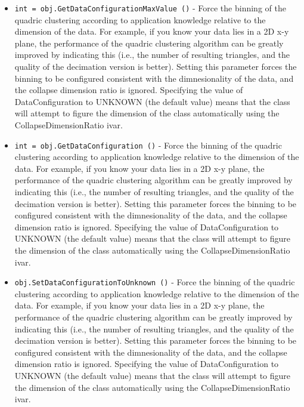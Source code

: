 \begin{itemize}
\item  \verb|int = obj.GetDataConfigurationMaxValue ()| -  Force the binning of the quadric clustering according to application
 knowledge relative to the dimension of the data. For example, if you
 know your data lies in a 2D x-y plane, the performance of the quadric
 clustering algorithm can be greatly improved by indicating this (i.e.,
 the number of resulting triangles, and the quality of the decimation
 version is better). Setting this parameter forces the binning to be
 configured consistent with the dimnesionality of the data, and the
 collapse dimension ratio is ignored. Specifying the value of
 DataConfiguration to UNKNOWN (the default value) means that the class
 will attempt to figure the dimension of the class automatically using
 the CollapseDimensionRatio ivar.

\item  \verb|int = obj.GetDataConfiguration ()| -  Force the binning of the quadric clustering according to application
 knowledge relative to the dimension of the data. For example, if you
 know your data lies in a 2D x-y plane, the performance of the quadric
 clustering algorithm can be greatly improved by indicating this (i.e.,
 the number of resulting triangles, and the quality of the decimation
 version is better). Setting this parameter forces the binning to be
 configured consistent with the dimnesionality of the data, and the
 collapse dimension ratio is ignored. Specifying the value of
 DataConfiguration to UNKNOWN (the default value) means that the class
 will attempt to figure the dimension of the class automatically using
 the CollapseDimensionRatio ivar.

\item  \verb|obj.SetDataConfigurationToUnknown ()| -  Force the binning of the quadric clustering according to application
 knowledge relative to the dimension of the data. For example, if you
 know your data lies in a 2D x-y plane, the performance of the quadric
 clustering algorithm can be greatly improved by indicating this (i.e.,
 the number of resulting triangles, and the quality of the decimation
 version is better). Setting this parameter forces the binning to be
 configured consistent with the dimnesionality of the data, and the
 collapse dimension ratio is ignored. Specifying the value of
 DataConfiguration to UNKNOWN (the default value) means that the class
 will attempt to figure the dimension of the class automatically using
 the CollapseDimensionRatio ivar.


\end{itemize}
